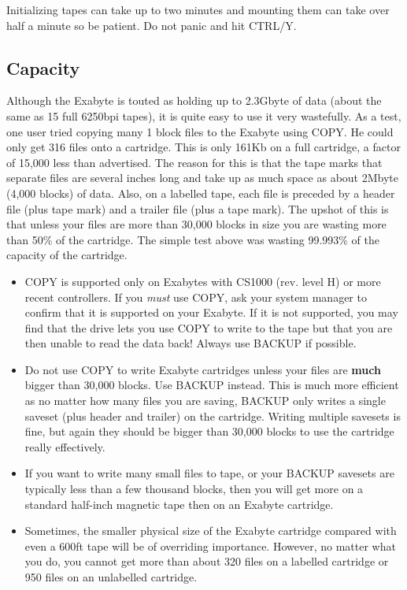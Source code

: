 Initializing tapes can take up to two minutes and mounting them can take
over half a minute so be patient. Do not panic and hit CTRL/Y. 

\subsection{Capacity}

Although the Exabyte is touted as holding up to 2.3Gbyte of data (about the
same as 15 full 6250bpi tapes), it is quite easy to use it very  wastefully.
As a test,
one user tried copying many 1 block files to the Exabyte  using COPY. He
could only get 316 files onto a cartridge. This is only  161Kb on a full
cartridge, a factor of 15,000 less than  advertised. The reason for this is
that the tape marks that separate  files are several inches long and take up as
much space as about  2Mbyte (4,000 blocks) of data. Also, on a labelled tape,
each file is  preceded by a header file (plus tape mark) and a trailer file
(plus a  tape mark). The upshot of this is that unless your files are more than 
30,000 blocks in size you are wasting more than 50\% of the cartridge. 
The simple test above was wasting 99.993\% of the capacity of the  cartridge.

\begin{itemize}

\item COPY is supported only on Exabytes with CS1000 (rev. level H)
or more recent 
controllers. If you {\it must} use COPY, ask your system manager to 
confirm that it is supported on your Exabyte. If it is not supported,
you may find that the drive lets you use COPY to write to the
tape but that you are then unable to read the data back! Always
use BACKUP if possible.

\item Do not use COPY to write Exabyte cartridges unless your files are
    {\bf much} bigger than 30,000 blocks. 
    Use BACKUP instead. This is much more efficient as no matter how many 
    files you are saving, BACKUP only writes a single saveset (plus 
    header and trailer) on the cartridge. Writing multiple savesets is 
    fine, but again they should be bigger than 30,000 blocks to use 
    the cartridge really effectively.

\item If you want to write many small files to tape, or your BACKUP 
    savesets are typically less than a few thousand blocks, then you 
    will get more on a standard half-inch magnetic tape then on an
    Exabyte cartridge.

\item Sometimes, the smaller physical size of the Exabyte cartridge 
    compared with even a 600ft tape will be of overriding importance. 
    However, no matter what you do, you cannot get more than about 320
    files on a labelled cartridge or 950 files on an unlabelled
    cartridge. 

\end{itemize}

